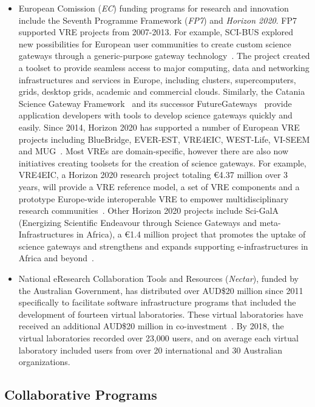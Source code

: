 \documentclass[review]{elsarticle}
\begin{document}
\begin{itemize}
\item European Comission (\emph{EC}) funding programs for research and innovation include the Seventh Programme Framework (\emph{FP7}) and \emph{Horizon 2020}. FP7 supported VRE projects from 2007-2013.
For example, SCI-BUS explored new possibilities for European user communities to create custom science gateways through a generic-purpose gateway technology~\cite{kacsuk2014-18}. 
The project created a toolset to provide seamless access to major computing, data and networking infrastructures and services in Europe, including clusters, supercomputers, grids, desktop grids, academic and commercial clouds. Similarly, the Catania Science Gateway Framework~\cite{decide-19} and its successor FutureGateways~\cite{futuregateway} provide application developers with tools to develop science gateways quickly and easily. 
Since 2014, Horizon 2020 has supported a number of European VRE projects including BlueBridge, EVER-EST, VRE4EIC, WEST-Life, VI-SEEM and MUG~\cite{h2020-projects-20}. 
Most VREs are domain-specific, however there are also now initiatives creating toolsets for the creation of science gateways. 
For example, VRE4EIC, a Horizon 2020 research project totaling \euro 4.37 million over 3 years, will provide a VRE reference model, a set of VRE components and a prototype Europe-wide interoperable VRE to empower multidisciplinary research communities~\cite{vre4eic-21}. 
Other Horizon 2020 projects include Sci-GalA (Energizing Scientific Endeavour through Science Gateways and meta-Infrastructures in Africa), a \euro 1.4 million project that promotes the uptake of science gateways and strengthens and expands supporting e-infrastructures in Africa and beyond~\cite{sci-gaia-22}.

\item National eResearch Collaboration Tools and Resources (\emph{Nectar}), funded by the Australian Government, has distributed over AUD\$20 million since 2011 specifically to facilitate software infrastructure programs that included the development of fourteen virtual laboratories. These virtual laboratories have received an additional AUD\$20 million in co-investment~\cite{nectar-impact-3}. By 2018, the virtual laboratories recorded over 23,000 users, and on average each virtual laboratory included users from over 20 international and 30 Australian organizations.

\end{itemize}

\subsection{Collaborative Programs}
\end{document}
